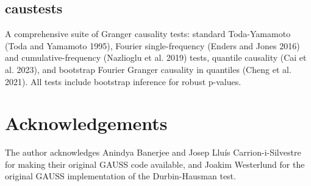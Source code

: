 \begin{Shaded}
\begin{Highlighting}[]
\OtherTok{\textless{}{-}}  \NormalTok{,}
                     \NormalTok{, } \NormalTok{)}
\end{Highlighting}
\end{Shaded}

\subsection{caustests}\label{caustests}

A comprehensive suite of Granger causality tests: standard Toda-Yamamoto
(Toda and Yamamoto 1995), Fourier single-frequency (Enders and Jones
2016) and cumulative-frequency (Nazlioglu et al. 2019) tests, quantile
causality (Cai et al. 2023), and bootstrap Fourier Granger causality in
quantiles (Cheng et al. 2021). All tests include bootstrap inference for
robust p-values.

\begin{Shaded}
\begin{Highlighting}[]
\OtherTok{\textless{}{-}}  \NormalTok{, } \NormalTok{, } \NormalTok{)}

\OtherTok{\textless{}{-}}  \NormalTok{(}\NormalTok{, }\NormalTok{, }\NormalTok{), } \NormalTok{)}
\end{Highlighting}
\end{Shaded}

\section{Acknowledgements}\label{acknowledgements}

The author acknowledges Anindya Banerjee and Josep Lluís
Carrion-i-Silvestre for making their original GAUSS code available, and
Joakim Westerlund for the original GAUSS implementation of the
Durbin-Hausman test.

